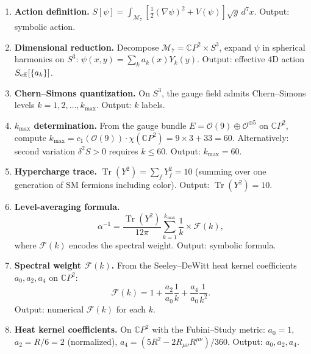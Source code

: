 \documentclass[11pt,a4paper]{article}
\theoremstyle{remark}
\newcommand{\CP}{\mathbb{C}P}
\newcommand{\Tr}{\operatorname{Tr}}
\begin{document}
\begin{enumerate}
\item \textbf{Action definition.} $S[\psi] = \int_{\mathcal{M}_7} \left[\frac{1}{2}(\nabla\psi)^2 + V(\psi)\right]\sqrt{g}\,d^7x$.
  Output: symbolic action.

\item \textbf{Dimensional reduction.} Decompose $\mathcal{M}_7 = \CP^2 \times S^3$,
  expand $\psi$ in spherical harmonics on $S^3$: $\psi(x,y) = \sum_k a_k(x) Y_k(y)$.
  Output: effective 4D action $S_{\rm eff}[\{a_k\}]$.

\item \textbf{Chern--Simons quantization.} On $S^3$, the gauge field admits
  Chern--Simons levels $k = 1, 2, \ldots, k_{\max}$.
  Output: $k$ labels.

\item \textbf{$k_{\max}$ determination.} From the gauge bundle
  $E = \mathcal{O}(9) \oplus \mathcal{O}^{\oplus 5}$ on $\CP^2$,
  compute $k_{\max} = c_1(\mathcal{O}(9)) \cdot \chi(\CP^2) = 9 \times 3 + 33 = 60$.
  Alternatively: second variation $\delta^2 S > 0$ requires $k \leq 60$.
  Output: $k_{\max} = 60$.

\item \textbf{Hypercharge trace.} $\Tr(Y^2) = \sum_f Y_f^2 = 10$
  (summing over one generation of SM fermions including color).
  Output: $\Tr(Y^2) = 10$.

\item \textbf{Level-averaging formula.}
  \begin{equation}
  \alpha^{-1} = \frac{\Tr(Y^2)}{12\pi} \sum_{k=1}^{k_{\max}} \frac{1}{k}
    \times \mathcal{F}(k),
  \end{equation}
  where $\mathcal{F}(k)$ encodes the spectral weight.
  Output: symbolic formula.

\item \textbf{Spectral weight $\mathcal{F}(k)$.} From the Seeley--DeWitt
  heat kernel coefficients $a_0, a_2, a_4$ on $\CP^2$:
  \begin{equation}
  \mathcal{F}(k) = 1 + \frac{a_2}{a_0}\frac{1}{k} + \frac{a_4}{a_0}\frac{1}{k^2}.
  \end{equation}
  Output: numerical $\mathcal{F}(k)$ for each $k$.

\item \textbf{Heat kernel coefficients.} On $\CP^2$ with the Fubini--Study metric:
  $a_0 = 1$, $a_2 = R/6 = 2$ (normalized), $a_4 = (5R^2 - 2R_{\mu\nu}R^{\mu\nu})/360$.
  Output: $a_0, a_2, a_4$.


\end{enumerate}
\end{document}
